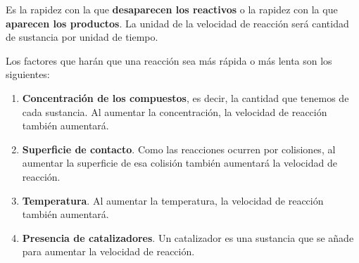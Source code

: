 \begin{definition}
        Es la rapidez con la que \textbf{desaparecen los reactivos} o la rapidez con la que \textbf{aparecen los productos}.
        La unidad de la velocidad de reacción será cantidad de sustancia por unidad de tiempo.
\end{definition}
Los factores que harán que una reacción sea más rápida o más lenta son los siguientes:
\begin{enumerate}[label=\numberballmDarkTeal]
        \item \textbf{Concentración de los compuestos}, es decir, la cantidad que tenemos de cada sustancia.
        Al aumentar la concentración, la velocidad de reacción también aumentará.
        \item \textbf{Superficie de contacto}.
        Como las reacciones ocurren por colisiones, al aumentar la superficie de esa colisión también aumentará la velocidad de reacción.
        \item \textbf{Temperatura}.
        Al aumentar la temperatura, la velocidad de reacción también aumentará.
        \item \textbf{Presencia de catalizadores}.
        Un catalizador es una sustancia que se añade para aumentar la velocidad de reacción.
\end{enumerate}

